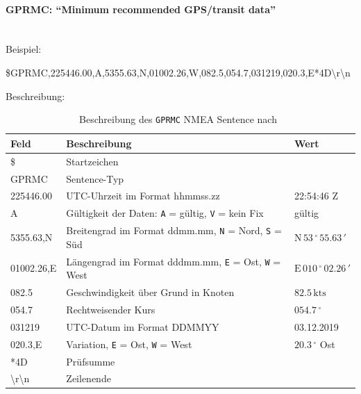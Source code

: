         \paragraph{GPRMC: ``Minimum recommended GPS/transit data''}\mbox{}\\
        Beispiel:
        \begin{center}
            \$GPRMC,225446.00,A,5355.63,N,01002.26,W,082.5,054.7,031219,020.3,E*4D\textbackslash r\textbackslash n
        \end{center}
        Beschreibung:
        \begin{table}[H]
            \centering
            \begin{tabular}{|l|l|l|}
                \hline
                \textbf{Feld}   & \textbf{Beschreibung}                 & \textbf{Wert}\\
                \hline
                \$              & Startzeichen                          & \\
                GPRMC           & Sentence-Typ                          & \\
                225446.00       & UTC-Uhrzeit im Format hhmmss.zz       & 22:54:46 Z \\
                A               & Gültigkeit der Daten: \texttt{A} = gültig, \texttt{V} = kein Fix  & gültig\\
                5355.63,N       & Breitengrad im Format ddmm.mm, \texttt{N} = Nord, \texttt{S} = Süd & $\mathrm{N}\,53\,^\circ\,55.63\,'$\\
                01002.26,E      & Längengrad im Format dddmm.mm, \texttt{E} = Ost, \texttt{W} = West & $\mathrm{E}\,010\,^\circ\,02.26\,'$\\
                082.5           & Geschwindigkeit über Grund in Knoten &  $82.5\,\mathrm{kts}$    \\
                054.7           & Rechtweisender Kurs &  $054.7\,^\circ$   \\
                031219          & UTC-Datum im Format DDMMYY & 03.12.2019 \\
                020.3,E         & Variation, \texttt{E} = Ost, \texttt{W} = West  & $20.3\,^\circ$ Ost\\
                *4D             & Prüfsumme                            & \\
                \textbackslash r\textbackslash n & Zeilenende          & \\
                \hline
            \end{tabular}
            \caption{Beschreibung des \texttt{GPRMC} NMEA Sentence nach~\cite{nmea0183}}
            \label{nmea_gprmc} 
        \end{table}
                
